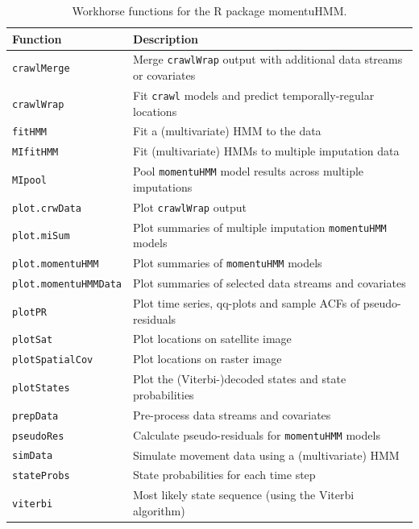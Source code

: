 \documentclass[12pt]{article}
\begin{document}
\begin{table}
  \caption{\label{tab:functions} Workhorse functions for the R package momentuHMM.}
  \begin{tabular}{ll}
  \toprule
  Function & Description \tabularnewline
  \midrule
  \verb|crawlMerge| & Merge \verb|crawlWrap| output with additional data streams or covariates  \tabularnewline 
  \verb|crawlWrap| & Fit \verb|crawl| models and predict temporally-regular locations  \tabularnewline  
  \verb|fitHMM| & Fit a (multivariate) HMM to the data  \tabularnewline  
  \verb|MIfitHMM| & Fit (multivariate) HMMs to multiple imputation data  \tabularnewline  
  \verb|MIpool| & Pool \verb|momentuHMM| model results across multiple imputations  \tabularnewline 
  \verb|plot.crwData| & Plot \verb|crawlWrap| output \tabularnewline 
  \verb|plot.miSum| & Plot summaries of multiple imputation \verb|momentuHMM| models  \tabularnewline 
  \verb|plot.momentuHMM| & Plot summaries of \verb|momentuHMM| models  \tabularnewline 
  \verb|plot.momentuHMMData| & Plot summaries of selected data streams and covariates  \tabularnewline 
  \verb|plotPR| & Plot time series, qq-plots and sample ACFs of pseudo-residuals \tabularnewline 
  \verb|plotSat| & Plot locations on satellite image \tabularnewline   
  \verb|plotSpatialCov| & Plot locations on raster image \tabularnewline   
  \verb|plotStates| & Plot the (Viterbi-)decoded states and state probabilities \tabularnewline 
  \verb|prepData| & Pre-process data streams and covariates \tabularnewline 
  \verb|pseudoRes| & Calculate pseudo-residuals for \verb|momentuHMM| models \tabularnewline 
  \verb|simData| & Simulate movement data using a (multivariate) HMM \tabularnewline 
  \verb|stateProbs| & State probabilities for each time step \tabularnewline 
  \verb|viterbi| & Most likely state sequence (using the Viterbi algorithm)  \tabularnewline  
  \bottomrule
  \end{tabular}
\end{table}
\end{document}
